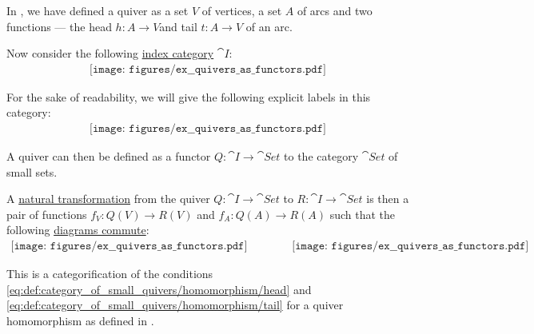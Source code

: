 \begin{example}\label{ex:quivers_as_functors}
  In , we have defined a quiver as a set \( V \) of vertices, a set \( A \) of arcs and two functions --- the head \( h: A \to V \)and tail \( t: A \to V \) of an arc.

  Now consider the following \hyperref[rem:categorical_diagram_as_functor]{index category} \( \cat{I}: \)
  \begin{equation}\label{eq:ex:quivers_as_functors/index/dots}
    \begin{aligned}
      \texttt{[image: figures/ex\_\_quivers\_as\_functors.pdf]}
    \end{aligned}
  \end{equation}

  For the sake of readability, we will give the following explicit labels in this category:
  \begin{equation}\label{eq:ex:quivers_as_functors/index/annotated}
    \begin{aligned}
      \texttt{[image: figures/ex\_\_quivers\_as\_functors.pdf]}
    \end{aligned}
  \end{equation}

  A quiver can then be defined as a functor \( Q: \cat{I} \to \cat{Set} \) to the category \hyperref[def:category_of_small_sets]{\( \cat{Set} \)} of small sets.

  A \hyperref[def:natural_transformation]{natural transformation} from the quiver \( Q: \cat{I} \to \cat{Set} \) to \( R: \cat{I} \to \cat{Set} \) is then a pair of functions \( f_V: Q(V) \to R(V) \) and \( f_A: Q(A) \to R(A) \) such that the following \hyperref[def:categorical_diagram]{diagrams commute}:
  \begin{equation}\label{eq:ex:quivers_as_functors/index/diagram}
    \begin{aligned}
      \texttt{[image: figures/ex\_\_quivers\_as\_functors.pdf]}
      \quad\quad\quad\quad
      \texttt{[image: figures/ex\_\_quivers\_as\_functors.pdf]}
    \end{aligned}
  \end{equation}

  This is a categorification of the conditions \eqref{eq:def:category_of_small_quivers/homomorphism/head} and \eqref{eq:def:category_of_small_quivers/homomorphism/tail} for a quiver homomorphism as defined in .
\end{example}

